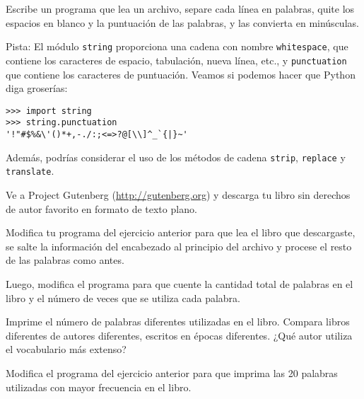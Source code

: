 \documentclass[10pt]{book}
\begin{document}
\begin{exercise}

Escribe un programa que lea un archivo, separe cada línea en
palabras, quite los espacios en blanco y la puntuación de las palabras,
y las convierta en minúsculas.

Pista: El módulo {\tt string} proporciona una cadena con nombre {\tt whitespace},
que contiene los caracteres de espacio, tabulación, nueva línea, etc.,
y {\tt punctuation} que contiene los caracteres de puntuación.  Veamos
si podemos hacer que Python diga groserías:

\begin{verbatim}
>>> import string
>>> string.punctuation
'!"#$%&\'()*+,-./:;<=>?@[\\]^_`{|}~'
\end{verbatim}
%
Además, podrías considerar el uso de los métodos de cadena {\tt strip},
{\tt replace} y {\tt translate}.

\end{exercise}


\begin{exercise}

Ve a Project Gutenberg (\url{http://gutenberg.org}) y descarga
tu libro sin derechos de autor favorito en formato de texto plano.

Modifica tu programa del ejercicio anterior para que lea el libro
que descargaste, se salte la información del encabezado al principio
del archivo y procese el resto de las palabras como antes.

Luego, modifica el programa para que cuente la cantidad total de palabras en
el libro y el número de veces que se utiliza cada palabra.

Imprime el número de palabras diferentes utilizadas en el libro.  Compara
libros diferentes de autores diferentes, escritos en épocas diferentes.
¿Qué autor utiliza el vocabulario más extenso?
\end{exercise}


\begin{exercise}

Modifica el programa del ejercicio anterior para que imprima las
20 palabras utilizadas con mayor frecuencia en el libro.

\end{exercise}
\end{document}
